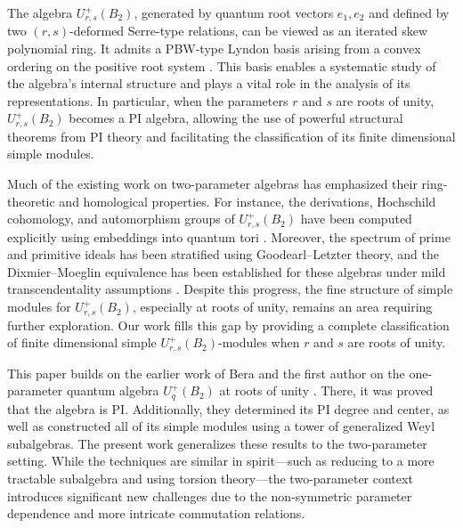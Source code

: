 \documentclass[12 pt,reqno]{amsart}
\numberwithin{equation}{section}
\theoremstyle{definition}
\theoremstyle{definition}
\theoremstyle{remark}
\theoremstyle{remark}
\begin{document}
\par The algebra $ U^+_{r,s}(B_2) $, generated by quantum root vectors $ e_1, e_2 $ and defined by two $(r, s)$-deformed Serre-type relations, can be viewed as an iterated skew polynomial ring. It admits a PBW-type Lyndon basis arising from a convex ordering on the positive root system \cite{huwang}. This basis enables a systematic study of the algebra's internal structure and plays a vital role in the analysis of its representations. In particular, when the parameters $r$ and $ s $ are roots of unity, $ U^+_{r,s}(B_2) $ becomes a PI algebra, allowing the use of powerful structural theorems from PI theory and facilitating the classification of its finite dimensional simple modules.
\par Much of the existing work on two-parameter algebras has emphasized their ring-theoretic and homological properties. For instance, the derivations, Hochschild cohomology, and automorphism groups of $ U^+_{r,s}(B_2) $ have been computed explicitly using embeddings into quantum tori \cite{Tang1}. Moreover, the spectrum of prime and primitive ideals has been stratified using Goodearl--Letzter theory, and the Dixmier--Moeglin equivalence has been established for these algebras under mild transcendentality assumptions \cite{Tang2}. Despite this progress, the fine structure of simple modules for $ U^+_{r,s}(B_2) $, especially at roots of unity, remains an area requiring further exploration. Our work fills this gap by providing a complete classification of finite dimensional simple $ U^+_{r,s}(B_2) $-modules when $ r $ and $ s $ are roots of unity.
\par This paper builds on the earlier work of Bera and the first author on the one-parameter quantum algebra $ U^+_q(B_2) $ at roots of unity \cite{sbsm}. There, it was proved that the algebra is PI. Additionally, they determined its PI degree and center, as well as constructed all of its simple modules using a tower of generalized Weyl subalgebras. The present work generalizes these results to the two-parameter setting. While the techniques are similar in spirit—such as reducing to a more tractable subalgebra and using torsion theory—the two-parameter context introduces significant new challenges due to the non-symmetric parameter dependence and more intricate commutation relations.
\end{document}
